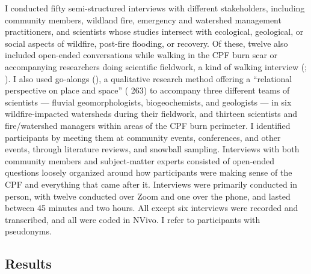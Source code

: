 \documentclass[
]{article}
\begin{document}
I conducted fifty semi-structured interviews with different stakeholders, including community members, wildland fire, emergency and watershed management practitioners, and scientists whose studies intersect with ecological, geological, or social aspects of wildfire, post-fire flooding, or recovery. Of these, twelve also included open-ended conversations while walking in the CPF burn scar or accompanying researchers doing scientific fieldwork, a kind of walking interview (; ). I also used go-alongs (), a qualitative research method offering a ``relational perspective on place and space'' ( 263) to accompany three different teams of scientists --- fluvial geomorphologists, biogeochemists, and geologists --- in six wildfire-impacted watersheds during their fieldwork, and thirteen scientists and fire/watershed managers within areas of the CPF burn perimeter. I identified participants by meeting them at community events, conferences, and other events, through literature reviews, and snowball sampling. Interviews with both community members and subject-matter experts consisted of open-ended questions loosely organized around how participants were making sense of the CPF and everything that came after it. Interviews were primarily conducted in person, with twelve conducted over Zoom and one over the phone, and lasted between 45 minutes and two hours. All except six interviews were recorded and transcribed, and all were coded in NVivo. I refer to participants with pseudonyms.

\subsection{Results}\label{results}
\end{document}

